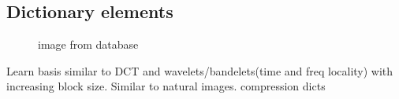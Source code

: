 \subsection{Dictionary elements}
\begin{figure}[h]
\centering
{}
\hspace{5mm}
\hspace{5mm}
\hspace{5mm}
\hspace{5mm}
\caption{image from database}
\label{fig:USC-SIPI}
\end{figure}

Learn basis similar to DCT and wavelets/bandelets(time and freq locality) with
increasing block size.
Similar to natural images.
compression dicts

% 

